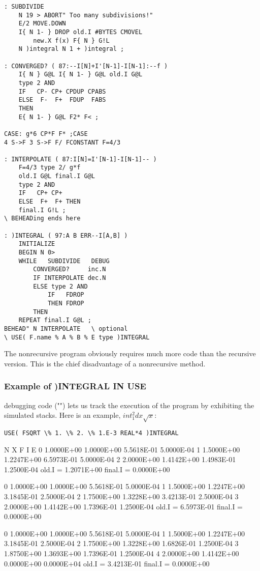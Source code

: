 \begin{lstlisting}
: SUBDIVIDE
    N 19 > ABORT" Too many subdivisions!"
    E/2 MOVE.DOWN
    I{ N 1- } DROP old.I #BYTES CMOVEL
        new.X f(x) F{ N } G!L
    N )integral N 1 + )integral ;

: CONVERGED? ( 87:--I[N]+I'[N-1]-I[N-1]:--f )
    I{ N } G@L I{ N 1- } G@L old.I G@L
    type 2 AND
    IF   CP- CP+ CPDUP CPABS
    ELSE  F-  F+  FDUP  FABS
    THEN
    E{ N 1- } G@L F2* F< ;

CASE: g*6 CP*F F* ;CASE
4 S->F 3 S->F F/ FCONSTANT F=4/3

: INTERPOLATE ( 87:I[N]=I'[N-1]-I[N-1]-- )
    F=4/3 type 2/ g*f
    old.I G@L final.I G@L
    type 2 AND
    IF   CP+ CP+
    ELSE  F+  F+ THEN
    final.I G!L ;
\ BEHEADing ends here

: )INTEGRAL ( 97:A B ERR--I[A,B] )
    INITIALIZE
    BEGIN N 0>
    WHILE   SUBDIVIDE   DEBUG
        CONVERGED?     inc.N
        IF INTERPOLATE dec.N
        ELSE type 2 AND
            IF   FDROP
            THEN FDROP
        THEN
    REPEAT final.I G@L ;
BEHEAD" N INTERPOLATE   \ optional
\ USE( F.name % A % B % E type )INTEGRAL
\end{lstlisting}

The nonrecursive program obviously requires much more code than the recursive version. This is the chief disadvantage of a nonrecursive method.

\subsubsection{Example of )INTEGRAL IN USE}
 debugging code ("") lets us track the execution of the program by exhibiting the simulated stacks. Here is an example, $int_{1}^{2} dx \sqrt{x}$:
\begin{lstlisting}
USE( FSQRT \% 1. \% 2. \% 1.E-3 REAL*4 )INTEGRAL
\end{lstlisting}

N      X            F          I             E
0 1.0000E+00  1.0000E+00 5.5618E-01 5.0000E-04
1 1.5000E+00  1.2247E+00 6.5973E-01 5.0000E-04
2 2.0000E+00  1.4142E+00 1.4983E-01 1.2500E-04
old.I = 1.2071E+00  final.I = 0.0000E+00

0 1.0000E+00  1.0000E+00 5.5618E-01 5.0000E-04
1 1.5000E+00  1.2247E+00 3.1845E-01 2.5000E-04
2 1.7500E+00  1.3228E+00 3.4213E-01 2.5000E-04
3 2.0000E+00  1.4142E+00 1.7396E-01 1.2500E-04
old.I = 6.5973E-01  final.I = 0.0000E+00

0 1.0000E+00  1.0000E+00 5.5618E-01 5.0000E-04
1 1.5000E+00  1.2247E+00 3.1845E-01 2.5000E-04
2 1.7500E+00  1.3228E+00 1.6826E-01 1.2500E-04
3 1.8750E+00  1.3693E+00 1.7396E-01 1.2500E-04
4 2.0000E+00  1.4142E+00 0.0000E+00 0.0000E+04
old.I = 3.4213E-01  final.I = 0.0000E+00

